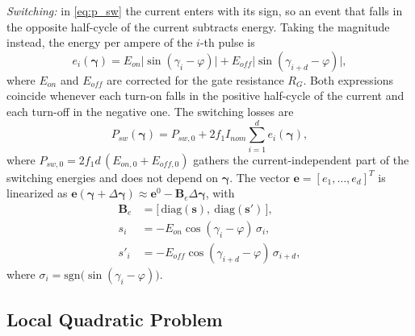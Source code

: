 \documentclass[conference]{IEEEtran}
\newcommand{\gv}{\boldsymbol{\gamma}}
\begin{document}
\textit{Switching:} in \eqref{eq:p_sw} the current enters with its sign, so
an event that falls in the opposite half-cycle of the current subtracts
energy. Taking the magnitude instead, the energy per ampere of the $i$-th
pulse is
%
\begin{equation}
  e_i(\gv) = E_{on}\big|\sin(\gamma_i-\varphi)\big|
           + E_{off}\big|\sin(\gamma_{i+d}-\varphi)\big|,
  \label{eq:rt_S}
\end{equation}
%
where $E_{on}$ and $E_{off}$ are corrected for the gate resistance $R_G$.
Both expressions coincide whenever each turn-on falls in the positive
half-cycle of the current and each turn-off in the negative one. The
switching losses are
%
\begin{equation}
  P_{sw}(\gv) = P_{sw,0} + 2f_1 I_{nom}\sum_{i=1}^{d} e_i(\gv),
  \label{eq:rt_psw}
\end{equation}
%
where $P_{sw,0} = 2f_1d\,(E_{on,0}+E_{off,0})$ gathers the
current-independent part of the switching energies and does not depend on
$\gv$. The vector $\mathbf{e} = [e_1,\dots,e_d]^T$ is linearized as
$\mathbf{e}(\gv+\Delta\gv) \approx \mathbf{e}^0 - \mathbf{B}_e\Delta\gv$,
with
%
\begin{align}
  \mathbf{B}_e &= \big[\,\mathrm{diag}(\mathbf{s}),\
                  \mathrm{diag}(\mathbf{s}')\,\big], \nonumber\\
  s_i  &= -E_{on}\cos(\gamma_i-\varphi)\,\sigma_i, \nonumber\\
  s'_i &= -E_{off}\cos(\gamma_{i+d}-\varphi)\,\sigma_{i+d},
  \label{eq:rt_BS}
\end{align}
%
where $\sigma_i = \mathrm{sgn}\big(\sin(\gamma_i-\varphi)\big)$.

\subsection{Local Quadratic Problem}
\label{subsec:rt_fo}
\end{document}
